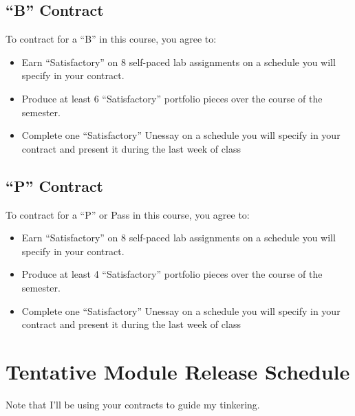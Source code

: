 \hypertarget{b-contract}{%
\subsection*{``B'' Contract}\label{b-contract}}


To contract for a ``B'' in this course, you agree to:

\begin{itemize}
\item
  Earn ``Satisfactory'' on 8 self-paced lab assignments on a schedule you will specify in your contract.
\item
  Produce at least 6 ``Satisfactory'' portfolio pieces over the course of the semester.
\item
  Complete one ``Satisfactory'' Unessay on a schedule you will specify in your contract and present it during the last week of class
\end{itemize}

\hypertarget{p-contract}{%
\subsection*{``P'' Contract}\label{p-contract}}


To contract for a ``P'' or Pass in this course, you agree to:

\begin{itemize}
\item
  Earn ``Satisfactory'' on 8 self-paced lab assignments on a schedule you will specify in your contract.
\item
  Produce at least 4 ``Satisfactory'' portfolio pieces over the course of the semester.
\item
  Complete one ``Satisfactory'' Unessay on a schedule you will specify in your contract and present it during the last week of class
\end{itemize}

\hypertarget{tentative-module-release-schedule}{%
\section*{Tentative Module Release Schedule}\label{tentative-module-release-schedule}}


Note that I'll be using your contracts to guide my tinkering.

